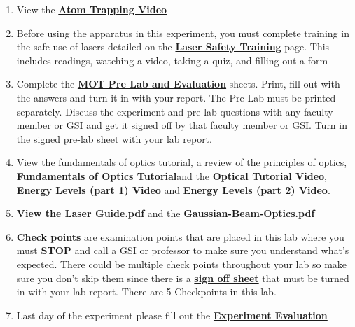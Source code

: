 \documentclass{../lab}
\begin{document}
\begin{enumerate}
    \item View the \href{http://youtu.be/1n4QumeydQ4}{\textbf{Atom Trapping Video}}

    \item Before using the apparatus in this experiment, you must complete training in the safe use of lasers detailed on the \href{http://experimentationlab.berkeley.edu/LaserSafety}{\textbf{Laser Safety Training}} page. This includes readings, watching a video, taking a quiz, and filling out a form

    \item Complete the \href{http://experimentationlab.berkeley.edu/MOTPreLab}{\textbf{MOT Pre Lab and Evaluation}} sheets. Print, fill out with the answers and turn it in with your report. The Pre-Lab must be printed separately. Discuss the experiment and pre-lab questions with any faculty member or GSI and get it signed off by that faculty member or GSI. Turn in the signed pre-lab sheet with your lab report.

    \item View the fundamentals of optics tutorial, a review of the principles of optics,\textbf{ }\href{http://experimentationlab.berkeley.edu/sites/default/files/QIE/fundamental-Optics.pdf}{\textbf{\textbf{Fundamentals of Optics Tutorial}}}and the \href{http://youtu.be/zUGBt5vc5FA}{\textbf{Optical Tutorial Video}}, \href{http://youtu.be/wyBOVjU5bBQ}{\textbf{Energy Levels (part 1) Video}} and \href{http://youtu.be/Eypw0DmVBxk}{\textbf{Energy Levels (part 2) Video}}.

    \item \href{http://experimentationlab.berkeley.edu/sites/default/files/MOT/Laser-Guide.pdf}{\textbf{\textbf{View the Laser Guide.pdf }}}and the \href{http://experimentationlab.berkeley.edu/sites/default/files/MOT/Gaussian-Beam-Optics.pdf}{\textbf{Gaussian-Beam-Optics.pdf}}

    \item \textbf{Check points} are examination points that are placed in this lab where you must \textbf{STOP} and call a GSI or professor to make sure you understand what's expected. There could  be multiple check points throughout your lab so make sure you don't skip them since there is a \href{http://experimentationlab.berkeley.edu/checkpointsmot}{\textbf{sign off sheet}} that must be turned in with your lab report. There are 5 Checkpoints in this lab.

    \item Last day of the experiment please fill out the \href{\ExperimentEvaluation}{\textbf{Experiment Evaluation}}
\end{enumerate}
\end{document}
